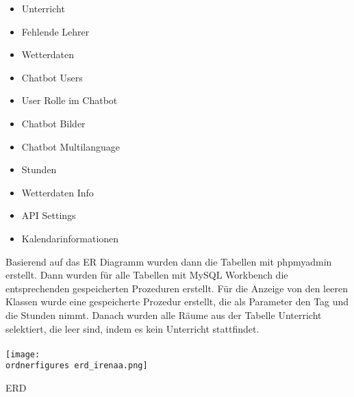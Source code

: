 	\begin{itemize}
		\item Unterricht
	\end{itemize}
    \begin{itemize}
    	\item Fehlende Lehrer
    \end{itemize}
    \begin{itemize}
    	\item Wetterdaten
    \end{itemize}
    \begin{itemize}
	\item Chatbot Users
    \end{itemize}	
	\begin{itemize}
		\item User Rolle im Chatbot
	\end{itemize}
	\begin{itemize}
		\item Chatbot Bilder
	\end{itemize}
	\begin{itemize}
		\item Chatbot Multilanguage
	\end{itemize}
	\begin{itemize}
		\item Stunden
	\end{itemize}
	\begin{itemize}
		\item Wetterdaten Info
	\end{itemize}
	\begin{itemize}
		\item API Settings
	\end{itemize}
	\begin{itemize}
	\item Kalendarinformationen
	\end{itemize}

Basierend auf das ER Diagramm wurden dann die Tabellen mit phpmyadmin erstellt. Dann wurden für alle Tabellen mit MySQL Workbench die entsprechenden gespeicherten Prozeduren erstellt. 
F\"ur die Anzeige von den leeren Klassen wurde eine gespeicherte Prozedur erstellt, die als Parameter den Tag und die Stunden nimmt. Danach wurden alle R\"aume aus der Tabelle Unterricht selektiert, die leer sind, indem es kein Unterricht stattfindet. \\
\\
\captionsetup{type=figure}
\texttt{[image: \\ordnerfigures erd\_irenaa.png]}
\caption{ERD}
\label{erd} 
\captionsetup{type=figure} 	
